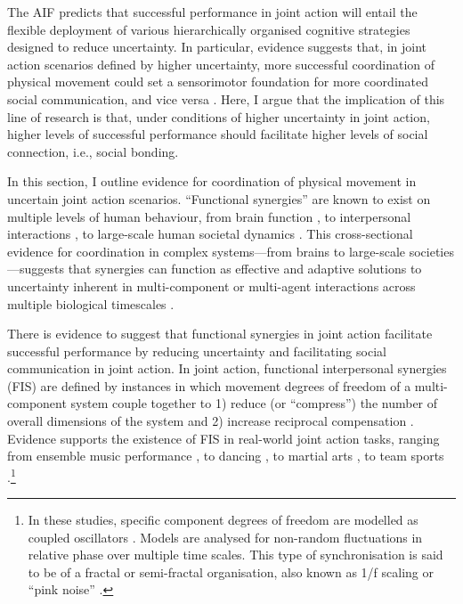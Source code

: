 \begin{CJK}{UTF8}{gbsn}
The AIF predicts that successful performance in joint action will entail the flexible deployment of various hierarchically organised cognitive strategies designed to reduce uncertainty.  In particular, evidence suggests that, in joint action scenarios defined by higher uncertainty, more successful coordination of physical movement could set a sensorimotor foundation for more coordinated social communication, and vice versa \citep{Wheatley2016}. Here, I argue that the implication of this line of research is that, under conditions of higher uncertainty in joint action, higher levels of successful performance should facilitate higher levels of social connection, i.e., social bonding.

In this section, I outline evidence for coordination of physical movement in uncertain joint action scenarios.  ``Functional synergies'' are known to exist on multiple levels of human behaviour, from brain function \citep{Yufik1998,Sengupta2013,Kelso2013}, to interpersonal interactions \citep{Kelso2009,Riley2011,Fusaroli2014}, to large-scale human societal dynamics \citep{Nowak2017}. This cross-sectional evidence for coordination in complex systems---from brains to large-scale societies---suggests that synergies can function as effective and adaptive solutions to uncertainty inherent in multi-component or multi-agent interactions across multiple biological timescales \citep{Nowak2017}.

There is evidence to suggest that functional synergies in joint action facilitate successful performance by reducing uncertainty and facilitating social communication in joint action.  In joint action, functional interpersonal synergies (FIS) are defined by instances in which movement degrees of freedom of a multi-component system couple together to 1) reduce (or ``compress'') the number of overall dimensions of the system and 2) increase reciprocal compensation \citep[the ability of one component of a synergy to react to changes in others; see][]{Riley2011}. Evidence supports the existence of FIS in real-world joint action tasks, ranging from ensemble music performance \citep{Keller2012,Miyata2017}, to dancing \citep{Chauvigne2017}, to martial arts \citep{Schmidt2012}, to team sports \citep{Duarte2012,Passos2014}.\footnote{In these studies, specific component degrees of freedom are modelled as coupled oscillators \citep[using the HKB model, which describes the change in the relative phase between two oscillatory components.  See][]{Haken1985,Kelso1986}.  Models are analysed for non-random fluctuations in relative phase over multiple time scales.  This type of synchronisation is said to be of a fractal or semi-fractal organisation, also known as 1/f scaling or ``pink noise'' \citep{Caron2017}.}


\end{CJK}
